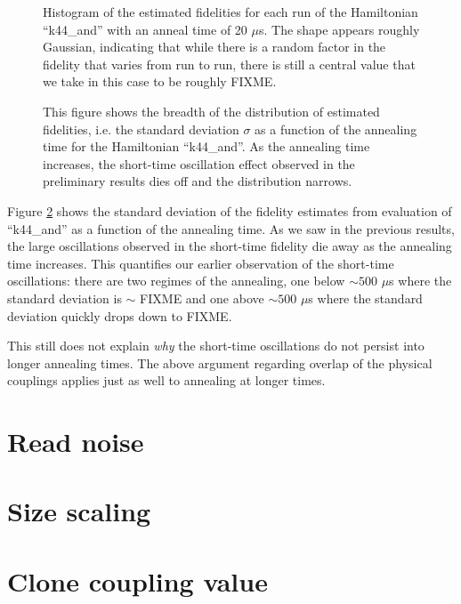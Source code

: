\begin{figure}
	\caption[Estimated Fidelity Histogram]{Histogram of the estimated fidelities for each run of the Hamiltonian ``k44\_and'' with an anneal time of 20 $\mu$s.  The shape appears roughly Gaussian, indicating that while there is a random factor in the fidelity that varies from run to run, there is still a central value that we take in this case to be roughly FIXME.}
	\label{fig:hist}
\end{figure}

\begin{figure}
	\caption[Fidelity Distribution vs. Time]{This figure shows the breadth of the distribution of estimated fidelities, i.e. the standard deviation $\sigma$ as a function of the annealing time for the Hamiltonian ``k44\_and''.  As the annealing time increases, the short-time oscillation effect observed in the preliminary results dies off and the distribution narrows.}
	\label{fig:std_time}
\end{figure}

Figure \ref{fig:std_time} shows the standard deviation of the fidelity estimates from evaluation of ``k44\_and'' as a function of the annealing time.  As we saw in the previous results, the large oscillations observed in the short-time fidelity die away as the annealing time increases.  This quantifies our earlier observation of the short-time oscillations: there are two regimes of the annealing, one below $\sim 500$ $\mu$s where the standard deviation is $\sim$ FIXME and one above $\sim 500$ $\mu$s where the standard deviation quickly drops down to FIXME.

This still does not explain \emph{why} the short-time oscillations do not persist into longer annealing times.  The above argument regarding overlap of the physical couplings applies just as well to annealing at longer times.

\section{Read noise}

\section{Size scaling}

\section{Clone coupling value}
